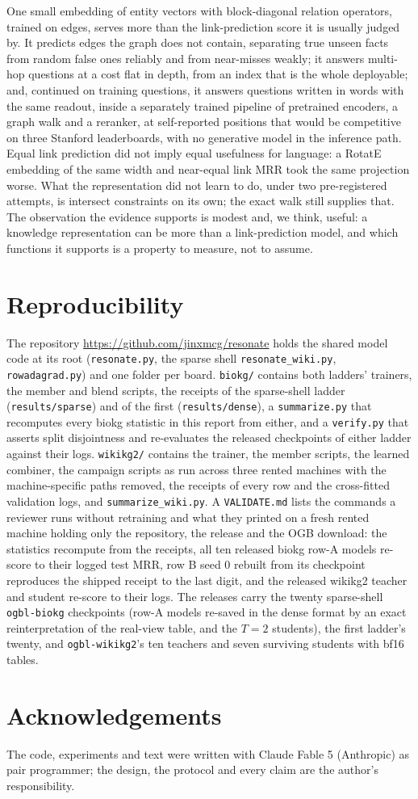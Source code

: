 \documentclass[11pt,a4paper]{article}
\begin{document}
One small embedding of entity vectors with block-diagonal relation
operators, trained on edges, serves more than the link-prediction score
it is usually judged by. It predicts edges the graph does not contain,
separating true unseen facts from random false ones reliably and from
near-misses weakly; it answers multi-hop questions at a cost flat in
depth, from an index that is the whole deployable; and, continued on
training questions, it answers questions written in words with the
same readout, inside a separately trained pipeline of pretrained
encoders, a graph walk and a reranker, at self-reported positions that
would be competitive on three Stanford leaderboards, with no generative
model in the inference path. Equal link
prediction did not imply equal usefulness for language: a RotatE embedding
of the same width and near-equal link MRR took the same projection
worse. What the representation did not learn to do, under two pre-registered
attempts, is intersect constraints on its own; the exact walk still
supplies that. The observation the evidence supports is modest and, we
think, useful: a knowledge representation can be more than a
link-prediction model, and which functions it supports is a property to
measure, not to assume.

\section{Reproducibility}

The repository \url{https://github.com/jinxmcg/resonate} holds the shared
model code at its root (\texttt{resonate.py}, the sparse shell
\texttt{resonate\_wiki.py}, \texttt{rowadagrad.py}) and one folder per
board. \texttt{biokg/} contains both ladders' trainers, the member and
blend scripts, the receipts of the sparse-shell ladder
(\texttt{results/sparse}) and of the first (\texttt{results/dense}), a
\texttt{summarize.py} that recomputes every biokg statistic in this report
from either, and a \texttt{verify.py} that asserts split disjointness and
re-evaluates the released checkpoints of either ladder against their
logs. \texttt{wikikg2/} contains the trainer, the member scripts, the
learned combiner, the campaign scripts as run across three rented
machines with the machine-specific paths removed, the receipts of every
row and the cross-fitted validation logs, and \texttt{summarize\_wiki.py}. A \texttt{VALIDATE.md} lists the commands a
reviewer runs without retraining and what they printed on a fresh rented
machine holding only the repository, the release and the OGB download:
the statistics recompute from the receipts, all ten released biokg row-A
models re-score to their logged test MRR, row B seed 0 rebuilt from its
checkpoint reproduces the shipped receipt to the last digit, and the
released wikikg2 teacher and student re-score to their logs.
The releases carry the twenty sparse-shell \texttt{ogbl-biokg} checkpoints
(row-A models re-saved in the dense format by an exact reinterpretation
of the real-view table, and the $T=2$ students), the first ladder's
twenty, and \texttt{ogbl-wikikg2}'s ten teachers and seven surviving
students with bf16 tables.

\section*{Acknowledgements}
The code, experiments and text were written with Claude Fable 5
(Anthropic) as pair programmer; the design, the protocol and every claim
are the author's responsibility.



\end{document}
